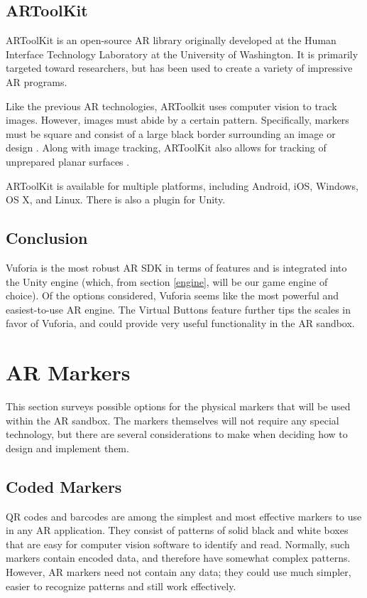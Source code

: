 \documentclass[letterpaper, 10pt, onecolumn, draftclsnofoot]{IEEEtran}
\begin{document}
\subsection{ARToolKit}
ARToolKit is an open-source AR library originally developed at the Human Interface Technology Laboratory at the University of Washington. It is primarily targeted toward researchers, but has been used to create a variety of impressive AR programs.

Like the previous AR technologies, ARToolkit uses computer vision to track images. However, images must abide by a certain pattern. Specifically, markers must be square and consist of a large black border surrounding an image or design \cite{artoolkit-docs}. Along with image tracking, ARToolKit also allows for tracking of unprepared planar surfaces \cite{artoolkit-features}.

ARToolKit is available for multiple platforms, including Android, iOS, Windows, OS X, and Linux. There is also a plugin for Unity.

\subsection{Conclusion}
Vuforia is the most robust AR SDK in terms of features and is integrated into the Unity engine (which, from section \ref{engine}, will be our game engine of choice). Of the options considered, Vuforia seems like the most powerful and easiest-to-use AR engine. The Virtual Buttons feature further tips the scales in favor of Vuforia, and could provide very useful functionality in the AR sandbox.

\section{AR Markers}
This section surveys possible options for the physical markers that will be used within the AR sandbox. The markers themselves will not require any special technology, but there are several considerations to make when deciding how to design and implement them.

\subsection{Coded Markers}
QR codes and barcodes are among the simplest and most effective markers to use in any AR application. They consist of patterns of solid black and white boxes that are easy for computer vision software to identify and read. Normally, such markers contain encoded data, and therefore have somewhat complex patterns. However, AR markers need not contain any data; they could use much simpler, easier to recognize patterns and still work effectively.
\end{document}
